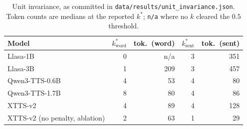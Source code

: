 \documentclass[11pt]{article}
\begin{document}
\begin{table}[h]
\centering
\caption{Unit invariance, as committed in
\texttt{data/results/unit\_invariance.json}. Token counts are medians at the
reported $k^\ast$; \texttt{n/a} where no $k$ cleared the $0.5$ threshold.}
\label{tab:unitinv}
\small
\begin{tabular}{@{}lrrrr@{}}
\toprule
Model & $k^\ast_{\mathrm{word}}$ & tok.\ (word) & $k^\ast_{\mathrm{sent}}$ & tok.\ (sent) \\
\midrule
Llasa-1B & 0 & n/a & 3 & 351 \\
Llasa-3B & 1 & 209 & 3 & 457 \\
Qwen3-TTS-0.6B & 4 & 53 & 4 & 80 \\
Qwen3-TTS-1.7B & 8 & 80 & 4 & 86 \\
XTTS-v2 & 4 & 89 & 4 & 128 \\
XTTS-v2 (no penalty, ablation) & 2 & 63 & 1 & 29 \\
\bottomrule
\end{tabular}
\end{table}
\end{document}
